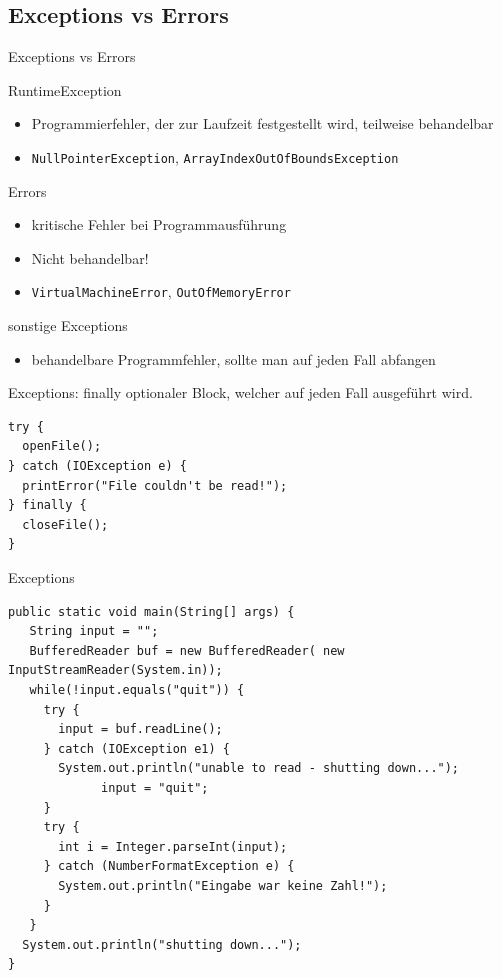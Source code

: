 \documentclass[18pt]{beamer}
\begin{document}
\subsection{Exceptions vs Errors}
\begin{frame}[fragile]{Exceptions vs Errors}
	\begin{block}{RuntimeException}
    \begin{itemize}
      \item Programmierfehler, der zur Laufzeit festgestellt wird, teilweise behandelbar
      \item \lstinline$NullPointerException$, \lstinline$ArrayIndexOutOfBoundsException$
    \end{itemize}
  \end{block}
  \begin{block}{Errors}
    \begin{itemize}
      \item kritische Fehler bei Programmausführung
      \item Nicht behandelbar!
      \item \lstinline$VirtualMachineError$, \lstinline$OutOfMemoryError$
    \end{itemize}
  \end{block}
  \begin{block}{sonstige Exceptions}
    \begin{itemize}
      \item behandelbare Programmfehler, sollte man auf jeden Fall abfangen
    \end{itemize}
  \end{block}
\end{frame}

\begin{frame}[fragile]{Exceptions: finally}
  optionaler Block, welcher auf jeden Fall ausgeführt wird.
	\begin{lstlisting}
try {
  openFile();
} catch (IOException e) {
  printError("File couldn't be read!");
} finally {
  closeFile();
}
  \end{lstlisting}
\end{frame}


\begin{frame}[fragile]{Exceptions}
\begin{lstlisting}
public static void main(String[] args) {
   String input = "";
   BufferedReader buf = new BufferedReader( new InputStreamReader(System.in));
   while(!input.equals("quit")) {  
     try {
       input = buf.readLine();
     } catch (IOException e1) {
       System.out.println("unable to read - shutting down...");
			 input = "quit";
     }
     try {
       int i = Integer.parseInt(input);
     } catch (NumberFormatException e) {
       System.out.println("Eingabe war keine Zahl!");
     }
   }
  System.out.println("shutting down...");
}\end{lstlisting}
\end{frame}
\end{document}
